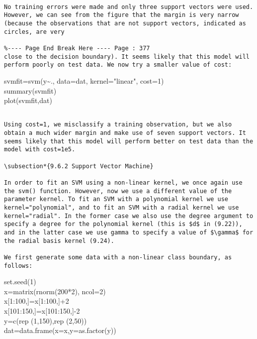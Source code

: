 \documentclass[10pt]{article}
\begin{document}
\begin{verbatim}

No training errors were made and only three support vectors were used. However, we can see from the figure that the margin is very narrow (because the observations that are not support vectors, indicated as circles, are very

%---- Page End Break Here ---- Page : 377
close to the decision boundary). It seems likely that this model will perform poorly on test data. We now try a smaller value of cost:
\end{verbatim}

\begin{displayquote}
svmfit=svm(y\~{}., data=dat, kernel="linear", cost=1)\\
summary(svmfit)\\
plot(svmfit,dat)
\end{displayquote}

\begin{verbatim}

Using cost=1, we misclassify a training observation, but we also obtain a much wider margin and make use of seven support vectors. It seems likely that this model will perform better on test data than the model with cost=1e5.

\subsection*{9.6.2 Support Vector Machine}

In order to fit an SVM using a non-linear kernel, we once again use the svm() function. However, now we use a different value of the parameter kernel. To fit an SVM with a polynomial kernel we use kernel="polynomial", and to fit an SVM with a radial kernel we use kernel="radial". In the former case we also use the degree argument to specify a degree for the polynomial kernel (this is $d$ in (9.22)), and in the latter case we use gamma to specify a value of $\gamma$ for the radial basis kernel (9.24).

We first generate some data with a non-linear class boundary, as follows:
\end{verbatim}

\begin{displayquote}
set.seed(1)\\
x=matrix(rnorm(200*2), ncol=2)\\[0pt]
x[1:100,]=x[1:100,]+2\\[0pt]
x[101:150,]=x[101:150,]-2\\
y=c(rep (1,150),rep (2,50))\\
dat=data.frame(x=x,y=as.factor(y))
\end{displayquote}
\end{document}
